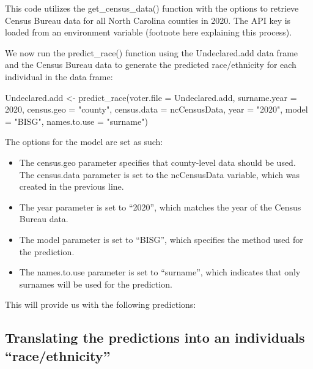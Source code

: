 \documentclass[
]{article}
\newenvironment{Shaded}{}{}
\newcommand{\AttributeTok}[1]{#1}
\newcommand{\DecValTok}[1]{#1}
\newcommand{\FunctionTok}[1]{#1}
\newcommand{\NormalTok}[1]{#1}
\newcommand{\OtherTok}[1]{\textcolor[rgb]{1.00,0.25,0.00}{#1}}
\newcommand{\StringTok}[1]{\textcolor[rgb]{0.00,0.50,0.50}{#1}}
\providecommand{\tightlist}{%
  \setlength{\itemsep}{0pt}\setlength{\parskip}{0pt}}
\begin{document}
This code utilizes the get\_census\_data() function with the options to
retrieve Census Bureau data for all North Carolina counties in 2020. The
API key is loaded from an environment variable (footnote here explaining
this process).

We now run the predict\_race() function using the Undeclared.add data
frame and the Census Bureau data to generate the predicted
race/ethnicity for each individual in the data frame:

\begin{Shaded}
\begin{Highlighting}[]
\NormalTok{Undeclared.add }\OtherTok{\textless{}{-}} \FunctionTok{predict\_race}\NormalTok{(}\AttributeTok{voter.file =}\NormalTok{ Undeclared.add, }
                               \AttributeTok{surname.year =} \DecValTok{2020}\NormalTok{,}
                               \AttributeTok{census.geo =} \StringTok{"county"}\NormalTok{, }
                               \AttributeTok{census.data =}\NormalTok{ ncCensusData,}
                               \AttributeTok{year =} \StringTok{"2020"}\NormalTok{,}
                               \AttributeTok{model =} \StringTok{"BISG"}\NormalTok{,}
                               \AttributeTok{names.to.use =} \StringTok{"surname"}\NormalTok{)}
\end{Highlighting}
\end{Shaded}

The options for the model are set as such:

\begin{itemize}
\tightlist
\item
  The census.geo parameter specifies that county-level data should be
  used. The census.data parameter is set to the ncCensusData variable,
  which was created in the previous line.
\item
  The year parameter is set to ``2020'', which matches the year of the
  Census Bureau data.
\item
  The model parameter is set to ``BISG'', which specifies the method
  used for the prediction.
\item
  The names.to.use parameter is set to ``surname'', which indicates that
  only surnames will be used for the prediction.
\end{itemize}

This will provide us with the following predictions:

\hypertarget{translating-the-predictions-into-an-individuals-raceethnicity}{%
\subsection{Translating the predictions into an individuals
``race/ethnicity''}\label{translating-the-predictions-into-an-individuals-raceethnicity}}
\end{document}
